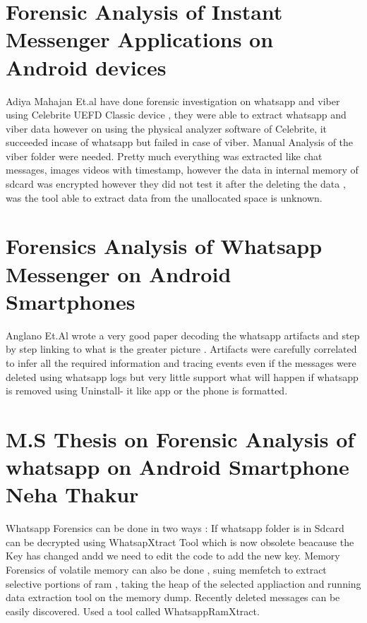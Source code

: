 \section{Forensic Analysis of Instant Messenger Applications on Android devices}
Adiya Mahajan Et.al \cite{mahajan_dahiya_sanghvi_2013} have done forensic investigation on whatsapp and viber using Celebrite UEFD Classic device , they were able to extract whatsapp and viber data however on using the physical analyzer software of Celebrite, it succeeded incase of whatsapp but failed in case of viber. Manual Analysis of the viber folder were needed. Pretty much everything was extracted like chat messages, images videos with timestamp, however the data in internal memory of sdcard was encrypted however they did not test it after the deleting the data , was the tool able to extract data from the unallocated space is unknown. \section{Forensics Analysis of Whatsapp Messenger on Android Smartphones }
Anglano Et.Al \cite{anglano_2014} wrote a very good paper decoding the whatsapp artifacts and step by step linking to what is the greater picture . Artifacts were carefully correlated to infer all the required information and tracing events even if the messages were deleted using whatsapp logs but very little support what will happen if whatsapp is removed using Uninstall- it like app or the phone is formatted.
\section{M.S Thesis on Forensic Analysis of whatsapp on Android Smartphone 
Neha Thakur }
\cite{thakur_2013}Whatsapp Forensics can be done in two ways : If whatsapp folder is in Sdcard can be decrypted using WhatsapXtract Tool which is now obsolete beacause the Key has changed andd we need to edit the code to add the new key. Memory Forensics of volatile memory can also be done , suing memfetch to extract selective portions of ram , taking the heap of the selected appliaction and running data extraction tool on the memory dump. Recently deleted messages can be easily 
discovered. Used a tool called WhatsappRamXtract. 
